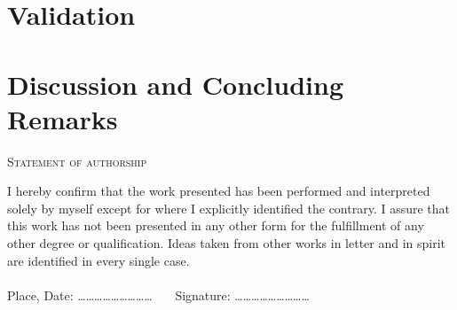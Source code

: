 \documentclass[a4paper,captions=tableheading,12pt]{scrartcl}
\begin{document}
	\section{Validation} \label{sec:validation}
	
	
	\section{Discussion and Concluding Remarks} \label{sec:conclusion}
	
	
	\pagebreak
	\printbibliography[title={References}]
	
%	
%	
	
	\clearpage 
	\begin{center}
		\textsc{Statement of authorship}
	\end{center}
	I  hereby confirm that the  work  presented  has  been  performed  and interpreted solely by myself except for where I explicitly identified the contrary. I assure  that  this  work  has not been presented in  any  other form  for  the  fulfillment  of  any  other  degree  or  qualification.  Ideas taken  from  other  works in  letter and  in  spirit are identified in every single case.
	\\ \\
	Place, Date: \dots\dots \dots \dots \dots \dots \dots \dots \dots ~~~ Signature: \dots \dots \dots \dots \dots \dots \dots \dots \dots
\end{document}
